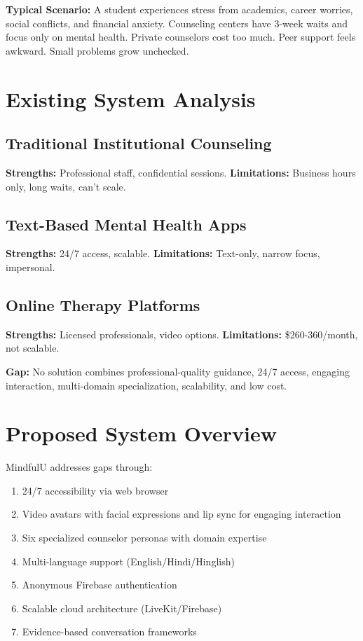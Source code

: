 \documentclass[11pt,a4paper]{report}
\begin{document}
\textbf{Typical Scenario:} A student experiences stress from academics, career worries, social conflicts, and financial anxiety. Counseling centers have 3-week waits and focus only on mental health. Private counselors cost too much. Peer support feels awkward. Small problems grow unchecked.

\section{Existing System Analysis}

\subsection{Traditional Institutional Counseling}
\textbf{Strengths:} Professional staff, confidential sessions. \textbf{Limitations:} Business hours only, long waits, can't scale.

\subsection{Text-Based Mental Health Apps}
\textbf{Strengths:} 24/7 access, scalable. \textbf{Limitations:} Text-only, narrow focus, impersonal.

\subsection{Online Therapy Platforms}
\textbf{Strengths:} Licensed professionals, video options. \textbf{Limitations:} \$260-360/month, not scalable.

\textbf{Gap:} No solution combines professional-quality guidance, 24/7 access, engaging interaction, multi-domain specialization, scalability, and low cost.

\section{Proposed System Overview}
MindfulU addresses gaps through:
\begin{enumerate}
    \item 24/7 accessibility via web browser
    \item Video avatars with facial expressions and lip sync for engaging interaction
    \item Six specialized counselor personas with domain expertise
    \item Multi-language support (English/Hindi/Hinglish)
    \item Anonymous Firebase authentication
    \item Scalable cloud architecture (LiveKit/Firebase)
    \item Evidence-based conversation frameworks
\end{enumerate}
\end{document}
